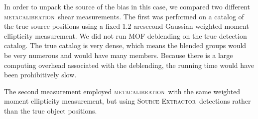 \documentclass[draft, iop, twocolappendix, appendixfloats, numberedappendix, apj]{hackemulateapj}
\newcommand{\mcal}{\textsc{metacalibration}}
\newcommand{\sx}{\textsc{Source Extractor}}
\begin{document}






In order to unpack the source of the bias in this case, we compared two
different \mcal\ shear measurements. The first was performed on a catalog of
the true source positions using a fixed 1.2 arcsecond Gaussian weighted moment
ellipticity measurement. We did not run MOF deblending on the true detection
catalog.  The true catalog is very dense, which means the blended groups would
be very numerous and would have many members.  Because there is a large
computing overhead associated with the deblending, the running time would have
been prohibitively slow.

The second measurement employed \mcal\ with the same weighted moment
ellipticity measurement, but using \sx\ detections rather than the true object
positions.
\end{document}
